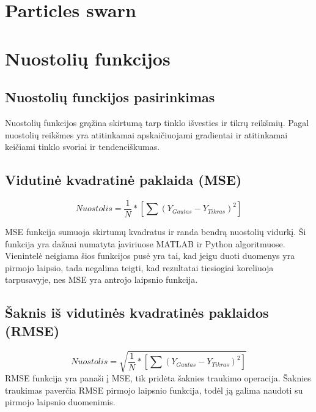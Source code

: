 \documentclass{VUMIFInfKursinis}
\begin{document}


\section{Particles swarn}

\section{Nuostolių funkcijos}

\subsection{Nuostolių funckijos pasirinkimas}





\par
Nuostolių funkcijos grąžina skirtumą tarp tinklo išvesties ir tikrų reikšmių. Pagal
nuostolių reikšmes yra atitinkamai apskaičiuojami gradientai ir atitinkamai
keičiami tinklo svoriai ir tendenciškumas.

\subsection{Vidutinė kvadratinė paklaida (MSE)}
\[
  Nuostolis = \frac{1}{N} * [\sum(Y_{Gautas}-Y_{Tikras})^{2}]
\]
\par
MSE funkcija sumuoja skirtumų kvadratus ir randa bendrą nuostolių vidurkį.
Ši funkcija yra dažnai numatyta įaviriuose MATLAB ir Python algoritmuose.
Vienintelė neigiama šios funkcijos pusė yra tai, kad jeigu duoti duomenys yra pirmojo
laipsio, tada negalima teigti, kad rezultatai tiesiogiai koreliuoja tarpusavyje,
nes MSE yra antrojo laipsnio funkcija. \cite{salt12}

\subsection{Šaknis iš vidutinės kvadratinės paklaidos (RMSE)}
\[
  Nuostolis = \sqrt{\frac{1}{N} * [\sum (Y_{Gautas}-Y_{Tikras})^{2}]}
\]
RMSE funkcija yra panaši į MSE, tik pridėta šaknies traukimo operacija.
Šaknies traukimas paverčia RMSE pirmojo laipsnio funkcija, todėl ją galima naudoti
su pirmojo laipsnio duomenimis. \cite{salt12}
\end{document}
